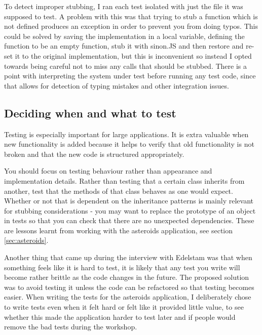 \documentclass[11pt]{article}
\begin{document}
To detect improper stubbing, I ran each test isolated with just the file it was supposed to test. A problem with this was that trying to stub a function which is not defined produces an exception in order to prevent you from doing typos. This could be solved by saving the implementation in a local variable, defining the function to be an empty function, stub it with sinon.JS and then restore and re-set it to the original implementation, but this is inconvenient so instead I opted towards being careful not to miss any calls that should be stubbed. There is a point with interpreting the system under test before running any test code, since that allows for detection of typing mistakes and other integration issues.

\subsection{Deciding when and what to test}

Testing is especially important for large applications. It is extra valuable when new functionality is added because it helps to verify that old functionality is not broken and that the new code is structured appropriately. \cite[questions~6-7]{Stenmark}

You should focus on testing behaviour rather than appearance and implementation details. \cite[question~10]{Edelstam} Rather than testing that a certain class inherits from another, test that the methods of that class behaves as one would expect. Whether or not that is dependent on the inheritance patterns is mainly relevant for stubbing considerations - you may want to replace the prototype of an object in tests so that you can check that there are no unexpected dependencies. These are lessons learnt from working with the asteroids application, see section \ref{sec:asteroids}. 

Another thing that came up during the interview with Edelstam was that when something feels like it is hard to test, it is likely that any test you write will become rather brittle as the code changes in the future. The proposed solution was to avoid testing it unless the code can be refactored so that testing becomes easier. \cite[question~30]{Edelstam} When writing the tests for the asteroids application, I deliberately chose to write tests even when it felt hard or felt like it provided little value, to see whether this made the application harder to test later and if people would remove the bad tests during the workshop.
\end{document}
